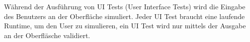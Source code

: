 
Während der Ausführung von UI Tests (User Interface Tests) wird die Eingabe des Benutzers an der Oberfläche simuliert.
Jeder UI Test braucht eine laufende Runtime, um den User zu simulieren, 
ein UI Test wird nur mittels der Ausgabe an der Oberfläsche validiert.